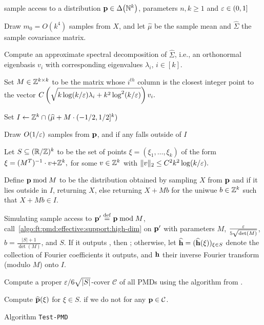 \begin{algorithm}[ht]
  \begin{algorithmic}[1]
    \Require sample access to a distribution $\mathbf{p}\in\Delta\!\left(\mathbb{N}^k\right)$, parameters $n,k\geq 1$ and $\varepsilon\in(0,1]$
    
    \State{}
    
    \State\label{algo:step:estimates:mu:sigma:pmd} Draw {$m_0 = O(k^4)$} samples from $X$, and 
let $\widehat{\mu}$ be the sample mean and $\widehat{\Sigma}$ the sample covariance matrix.
	
	\State Compute an approximate spectral decomposition of $\widehat{\Sigma}$, i.e., 
an orthonormal eigenbasis $v_i$ with corresponding eigenvalues $\lambda_i$, $i \in [k].$


	\State Set $M \in \mathbb{Z}^{k \times k}$  to be the matrix whose $i^{th}$ column 
is the closest integer point to the vector $C \left(\sqrt{k \log(k/\varepsilon)\lambda_i+k^2\log^2(k/\varepsilon)}\right)v_i.$
	
	\State Set $I \gets \mathbb{Z}^k\cap (\widehat{\mu} + M \cdot (-1/2,1/2]^k)$

	\State\label{algo:step:effectivesupport:pmd} Draw $O(1/\varepsilon)$ samples from $\mathbf{p}$, and \Return \reject if any falls outside of $I$

	\State\label{algo:step:dft:computation:pmd} Let $S \subseteq (\mathbb{R}/\mathbb{Z})^k$ to be the set of points $\xi = (\xi_1, \ldots, \xi_k)$ 
of the form $\xi = (M^T)^{-1} \cdot v {+\mathbb{Z}^k},$ for some $v\in \mathbb{Z}^k$ with $\|v\|_2 \leq C^2 k^2 \log(k/\varepsilon).$

	\State Define $\mathbf{p}\bmod M$ to be the distribution obtained by sampling $X$ from $\mathbf{p}$ and if it lies outside in $I$, returning $X$, else returning $X + M b$ for the uniwue $b \in \mathbb{Z}^k$ such that $X + M b \in I$.

	\State\label{algo:step:fourier:support:pmd} Simulating sample access to $\mathbf{p}'\stackrel{\rm def}{=} \mathbf{p}\bmod M$, call~\cref{algo:ft:pmd:effective:support:high-dim} on $\mathbf{p}'$ with parameters $M$, $\frac{\varepsilon}{5\sqrt{\det(M)}}$, $b=\frac{|S|+1}{\det(M)}$, and $S$. If it outputs \reject, then \Return \reject; otherwise, let $\widehat{\mathbf{h}}=(\widehat{\mathbf{h}}(\xi))_{\xi\in S}$ denote the collection of Fourier coefficients it outputs, and $\mathbf{h}$ their inverse Fourier transform (modulo $M$) onto $I$.  

    \State \label{algo:step:cover:pmd} Compute a proper $\varepsilon/6\sqrt{|S|}$-cover $\mathcal{C}$ of all PMDs using the algorithm from \cite{DKS:15c}.
	
			\State Compute $\widehat{\mathbf{p}}(\xi)$ for $\xi \in S$.
				\Return \accept
			\EndIf
		\EndIf
	\EndFor
	\State \Return \reject if we do not \accept for any $\mathbf{p} \in \mathcal{C}$.
  \end{algorithmic}
  \caption{Algorithm \texttt{Test-PMD}}\label{algo:pmd:tester}
\end{algorithm}

